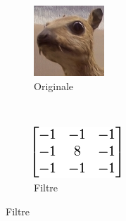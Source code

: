 \begin{figure}[!ht]
\centering
	\begin{subfigure}[b]{0.3\textwidth}
    	\centering
    		\includegraphics[width=\textwidth]{./images/ex_edge_or.png}
    		 \caption{Originale}
    		 \label{ex_edge_or}
    \end{subfigure}
    ~~
    \begin{subfigure}[b]{0.3\textwidth}
       	\centering
       		\includegraphics[width=\textwidth]{./images/filtre.png}
       		 \caption{Filtre}
       		 \label{ex_edge_fi}
    \end{subfigure}

\end{figure}
